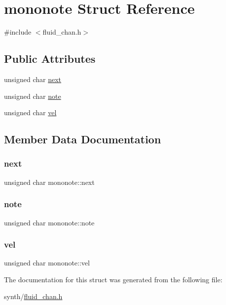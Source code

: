 \hypertarget{structmononote}{}\section{mononote Struct Reference}
\label{structmononote}


{\ttfamily \#include $<$fluid\+\_\+chan.\+h$>$}

\subsection*{Public Attributes}
\begin{DoxyCompactItemize}
\item 
unsigned char \hyperlink{structmononote_a363fd905b91cdabc321ab23afd26c1f3}{next}
\item 
unsigned char \hyperlink{structmononote_ad663844c224104c63cb4217ee3b1575f}{note}
\item 
unsigned char \hyperlink{structmononote_ac1e8540be419b6db495b5b62409a4b9f}{vel}
\end{DoxyCompactItemize}


\subsection{Member Data Documentation}
\mbox{\label{structmononote_a363fd905b91cdabc321ab23afd26c1f3}} 
\subsubsection{\texorpdfstring{next}{next}}
{\footnotesize\ttfamily unsigned char mononote\+::next}

\mbox{\label{structmononote_ad663844c224104c63cb4217ee3b1575f}} 
\subsubsection{\texorpdfstring{note}{note}}
{\footnotesize\ttfamily unsigned char mononote\+::note}

\mbox{\label{structmononote_ac1e8540be419b6db495b5b62409a4b9f}} 
\subsubsection{\texorpdfstring{vel}{vel}}
{\footnotesize\ttfamily unsigned char mononote\+::vel}



The documentation for this struct was generated from the following file\+:\begin{DoxyCompactItemize}
\item 
synth/\hyperlink{fluid__chan_8h}{fluid\+\_\+chan.\+h}\end{DoxyCompactItemize}
